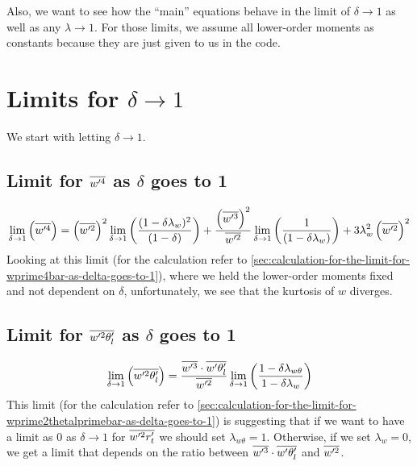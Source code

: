 Also, we want to see how the \enquote{main} equations behave in the limit of $\delta \to 1$
as well as any $\lambda \to 1$.
For those limits, we assume all lower-order moments as constants because they are just given to us in the code.


\section{Limits for \texorpdfstring{$\delta \to 1$}{delta to 1}}
\label{sec:limits-for-delta-to-1}

We start with letting $\delta \to 1$.

\subsection{Limit for \texorpdfstring{$\overline{w'^4}$}{wprime4bar} as \texorpdfstring{$\delta$}{delta} goes to 1}
\label{subsec:limit-for-wprime4bar-as-delta-goes-to-1}

\begin{align}
    \label{eq:limit_wprime4_delta_to_1}
    \lim_{\delta \to 1}\left(\overline{w'^4}\right)
    = \left(\overline{w'^2}\right)^2 \lim_{\delta \to 1} \left(\frac{ (1-\delta \lambda_w)^2}{(1-\delta)}\right) +
    \frac{\left(\overline{w'^3}\right)^2}{\overline{w'^2}} \lim_{\delta \to 1}\left(\frac{1}{(1-\delta \lambda_w)} \right) +
    3 \lambda_w^2 \left(\overline{w'^2}\right)^2
\end{align}
Looking at this limit (for the calculation refer to \cref{sec:calculation-for-the-limit-for-wprime4bar-as-delta-goes-to-1}),
where we held the lower-order moments fixed and not dependent on $\delta$,
unfortunately, we see that the kurtosis of $w$ diverges.

\subsection{Limit for \texorpdfstring{$\overline{w'^2 \theta_l'}$}{wprime2thetalbar} as \texorpdfstring{$\delta$}{delta} goes to 1}
\label{subsec:limit-for-wprime2thetalbar-as-delta-goes-to-1}

\begin{align}
    \label{eq:limit_wprime2thetalbar_delta_to_1}
    \lim_{\delta \to 1}\left(\overline{w'^2 \theta_l'}\right)
    = \frac{\overline{w'^3} \cdot \overline{w'\theta_l'}}{\overline{w'^2}}
    \lim_{\delta \to 1}
    \left(\frac{1 - \delta \lambda_{w\theta}}{1-\delta \lambda_w}\right)
\end{align}
This limit (for the calculation refer to \cref{sec:calculation-for-the-limit-for-wprime2thetalprimebar-as-delta-goes-to-1})
is suggesting that if we want to have a limit as 0 as $\delta \to 1$ for $\overline{w'^2 r_t'}$ we should set $\lambda_{w\theta} = 1$.
Otherwise, if we set $\lambda_w = 0$, we get a limit that depends on the ratio between $\overline{w'^3} \cdot \overline{w' \theta_l'}$ and $\overline{w'^2}$.

